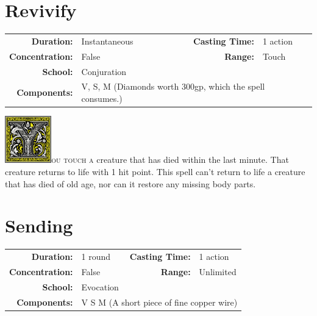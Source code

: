 \documentclass[12pt,showtrims]{memoir}
\begin{document}
\newpage
\section*{Revivify}

{
\small\centering\vspace{-6pt}
\begin{tabular}{rlrl}
\toprule

\textbf{Duration:} & Instantaneous &
\textbf{Casting Time:} & 1 action \\
\textbf{Concentration:} & False &
\textbf{Range:} & Touch \\
\textbf{School:} & Conjuration \\
\textbf{Components:} & \multicolumn{3}{p{0.7\textwidth}}{V, S, M (Diamonds worth 300gp, which the spell consumes.)}\\

\bottomrule
\end{tabular}
}

\vspace{1\baselineskip}\noindent 
\lettrine[lines=4]{\includegraphics[height=58pt]{initials/Y.png}}{ou touch a} creature that has died within the last minute. That creature returns to life with 1 hit point. This spell can't return to life a creature that has died of old age, nor can it restore any missing body parts.

\newpage
\section*{Sending}
{
\small\centering\vspace{-6pt}
\begin{tabular}{rlrl}
\toprule

\textbf{Duration:} & 1 round &
\textbf{Casting Time:} & 1 action \\
\textbf{Concentration:} & False &
\textbf{Range:} & Unlimited \\
\textbf{School:} & Evocation \\
\textbf{Components:} & \multicolumn{3}{p{0.7\textwidth}}{V S M (A short piece of fine copper wire)}\\

\bottomrule
\end{tabular}
}
\end{document}
